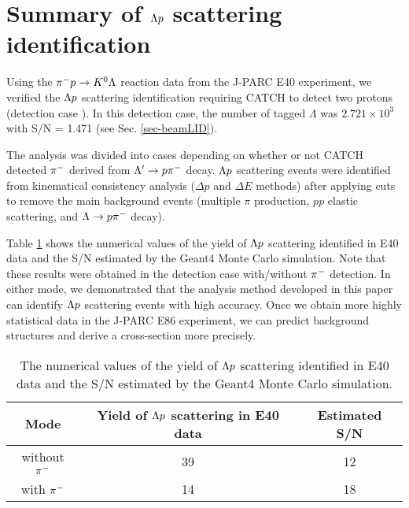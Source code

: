 \clearpage
\section{Summary of $\Lambda p$ scattering identification}
\label{sec-2p_summary}

Using the $\pi^- p \to K^0 \Lambda$ reaction data from the J-PARC E40 experiment, we verified the $\Lambda p$ scattering identification requiring CATCH to detect two protons (detection case ). In this detection case, the number of tagged $\Lambda$ was $2.721\times10^{3}$ with S/N = 1.471 (see Sec. \ref{sec-beamLID}). 

The analysis was divided into cases depending on whether or not CATCH detected $\pi^{-}$ derived from $\Lambda'\to p\pi^{-}$ decay. $\Lambda p$ scattering events were identified from kinematical consistency analysis ($\Delta p$ and $\Delta E$ methods) after applying cuts to remove the main background events (multiple $\pi$ production, $pp$ elastic scattering, and $\Lambda\to p\pi^{-}$ decay).

Table \ref{tab-2p_summary} shows the numerical values of the yield of $\Lambda p$ scattering identified in E40 data and the S/N estimated by the Geant4 Monte Carlo simulation. Note that these results were obtained in the detection case  with/without $\pi^{-}$ detection. In either mode, we demonstrated that the analysis method developed in this paper can identify $\Lambda p$ scattering events with high accuracy. Once we obtain more highly statistical data in the J-PARC E86 experiment, we can predict background structures and derive a cross-section more precisely.

\begin{table}[!tbph]
  \begin{center}
    \caption{The numerical values of the yield of $\Lambda p$ scattering identified in E40 data and the S/N estimated by the Geant4 Monte Carlo simulation. }
    \begin{tabular}{ccc}
      Mode & Yield of $\Lambda p$ scattering in E40 data& Estimated S/N \\ \hline \hline
      without $\pi^{-}$ & 39 & 12 \\ \hline
      with $\pi^{-}$ & 14 & 18 \\
    \end{tabular}
    \label{tab-2p_summary}
  \end{center}
\end{table}



%